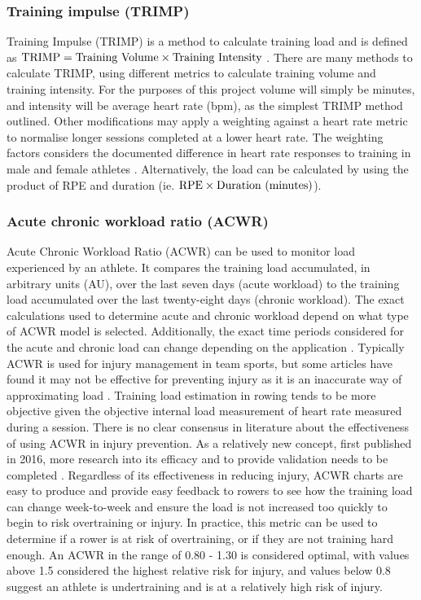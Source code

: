 \subsubsection{Training impulse (TRIMP)\label{subsec:trimp}}
Training Impulse (TRIMP) is a method to calculate training load and is defined as  $\textnormal{TRIMP} = \textnormal{Training Volume} \times \textnormal{Training Intensity}$ \autocite{TRIMPmethod}. There are many methods to calculate TRIMP, using different metrics to calculate training volume and training intensity. For the purposes of this project volume will simply be minutes, and intensity will be average heart rate (bpm), as the simplest TRIMP method outlined. Other modifications may apply a weighting against a heart rate metric to normalise longer sessions completed at a lower heart rate. The weighting factors considers the documented difference in heart rate responses to training in male and female athletes \autocite{Morton1990}. Alternatively, the load can be calculated by using the product of RPE and duration (ie. $\textnormal{RPE} \times \textnormal{Duration (minutes)}$).

\subsubsection{Acute chronic workload ratio (ACWR)}
Acute Chronic Workload Ratio (ACWR) can be used to monitor load experienced by an athlete. It compares the training load accumulated, in arbitrary units (AU), over the last seven days (acute workload) to the training load accumulated over the last twenty-eight days (chronic workload). The exact calculations used to determine acute and chronic workload depend on what type of ACWR model is selected. Additionally, the exact time periods considered for the acute and chronic load can change depending on the application \cite{White2023}. Typically ACWR is used for injury management in team sports, but some articles have found it may not be effective for preventing injury as it is an inaccurate way of approximating load \cite{Impellizzeri2020}. Training load estimation in rowing tends to be more objective given the objective internal load measurement of heart rate measured during a session. There is no clear consensus in literature about the effectiveness of using ACWR in injury prevention. As a relatively new concept, first published in 2016, more research into its efficacy and to provide validation needs to be completed \cite{Zouhal2021}. Regardless of its effectiveness in reducing injury, ACWR charts are easy to produce and provide easy feedback to rowers to see how the training load can change week-to-week and ensure the load is not increased too quickly to begin to risk overtraining or injury. 
In practice, this metric can be used to determine if a rower is at risk of overtraining, or if they are not training hard enough. An ACWR in the range of 0.80 - 1.30 is considered optimal, with values above 1.5 considered the highest relative risk for injury, and values below 0.8 suggest an athlete is undertraining and is at a relatively high risk of injury.

